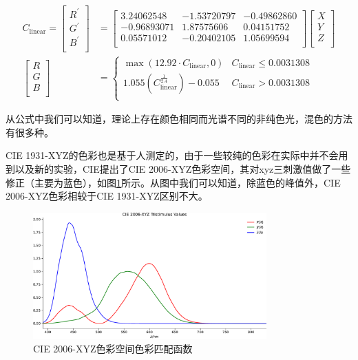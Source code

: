 \begin{equation}
    \begin{aligned}
        C_\text{linear} = \begin{bmatrix}
            R^\prime\\
            G^\prime\\
            B^\prime\\
        \end{bmatrix} &= 
        \begin{bmatrix}
            3.24062548& -1.53720797 & -0.49862860\\
            -0.96893071& 1.87575606 & 0.04151752\\
            0.05571012& -0.20402105 & 1.05699594\\
        \end{bmatrix}\begin{bmatrix}
            X\\
            Y\\
            Z\\
        \end{bmatrix} \\
        \begin{bmatrix}
            R\\
            G\\
            B\\
        \end{bmatrix} &= \left\{ \begin{matrix}
            \max(12.92\cdot C_\text{linear},0) & C_\text{linear}\leq 0.0031308 \\
            1.055(C_\text{linear}^\frac{1}{2.4}) - 0.055 & C_\text{linear}> 0.0031308 \\
        \end{matrix} \right.
    \end{aligned}
    \label{eq:trans-xyz2srgb}
\end{equation}

从公式中我们可以知道，理论上存在颜色相同而光谱不同的非纯色光，混色的方法有很多种。

CIE 1931-XYZ的色彩也是基于人测定的，由于一些较纯的色彩在实际中并不会用到以及新的实验，CIE提出了CIE 2006-XYZ色彩空间，其对xyz三刺激值做了一些修正（主要为蓝色），如图\ref{fig:tri-xyz-2}所示。从图中我们可以知道，除蓝色的峰值外，CIE 2006-XYZ色彩相较于CIE 1931-XYZ区别不大。

\begin{figure}[htbp]
    \centering
    \includegraphics[width=0.8\textwidth]{./imgs/sec1/xyz-2006.pdf}
    \caption{CIE 2006-XYZ色彩空间色彩匹配函数}
    \label{fig:tri-xyz-2}
 \end{figure}